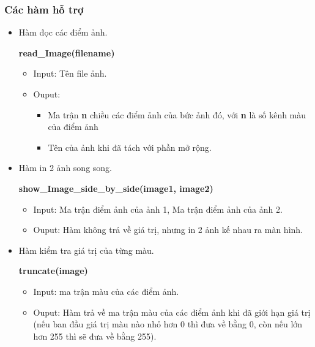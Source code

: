 \documentclass{report}
\begin{document}
\subsubsection{Các hàm hỗ trợ}
\begin{itemize}
    \item Hàm đọc các điểm ảnh.

    \begin{center}
        \textbf{read\_Image(filename)}
    \end{center}
    
    
        \begin{itemize}
            \item Input: Tên file ảnh.
            \item Ouput: 
            \begin{itemize}
                \item Ma trận \textbf{n} chiều các điểm ảnh của bức ảnh đó, với \textbf{n} là số kênh màu của điểm ảnh
                \item Tên của ảnh khi đã tách với phần mở rộng.
            \end{itemize}
            
        \end{itemize}
        
    

    \item Hàm in 2 ảnh song song.
    \begin{center}
        \textbf{show\_Image\_side\_by\_side(image1, image2)}
    \end{center}

        \begin{itemize}
            \item Input: Ma trận điểm ảnh của ảnh 1,  Ma trận điểm ảnh của ảnh 2.
            \item Ouput: Hàm không trả về giá trị, nhưng in 2 ảnh kế nhau ra màn hình.
        \end{itemize}
    
    

    \item Hàm kiểm tra giá trị của từng màu.
    \begin{center}
        \textbf{truncate(image)}
    \end{center}
    
        \begin{itemize}
            \item Input: ma trận màu của các điểm ảnh.
            \item Ouput: Hàm trả về ma trận màu của các điểm ảnh khi đã giới hạn giá trị (nếu ban đầu giá trị màu nào nhỏ hơn 0 thì đưa về bằng 0, còn nếu lớn hơn 255 thì sẽ đưa về bằng 255).
        \end{itemize}


\end{itemize}
\end{document}
